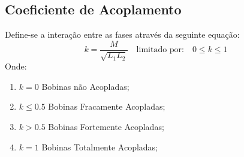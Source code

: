 \documentclass{article}
\begin{document}
\subsection{Coeficiente de Acoplamento}
\begin{definition}
    Define-se a interação entre as fases através da seguinte equação:
    \begin{equation}
    \boxed{
        k = \frac{M}{\sqrt{L_1L_2}}
    }\quad \text{limitado por:} \quad 0 \le k \le 1
    \end{equation}
    Onde:
    \begin{enumerate}[noitemsep]
        \item $k=0$ Bobinas não Acopladas;
        \item $k\le 0.5$ Bobinas Fracamente Acopladas;
        \item $k  > 0.5$ Bobinas Fortemente Acopladas;
        \item $k=1$ Bobinas Totalmente Acopladas;
    \end{enumerate}
\end{definition}
\end{document}
